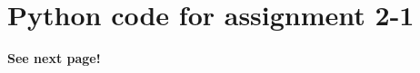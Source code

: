 \documentclass[../main.tex]{subfiles}
\begin{document}
\section{Python code for assignment 2-1}\label{app:code}
\bf{See next page!}

 
\end{document}
